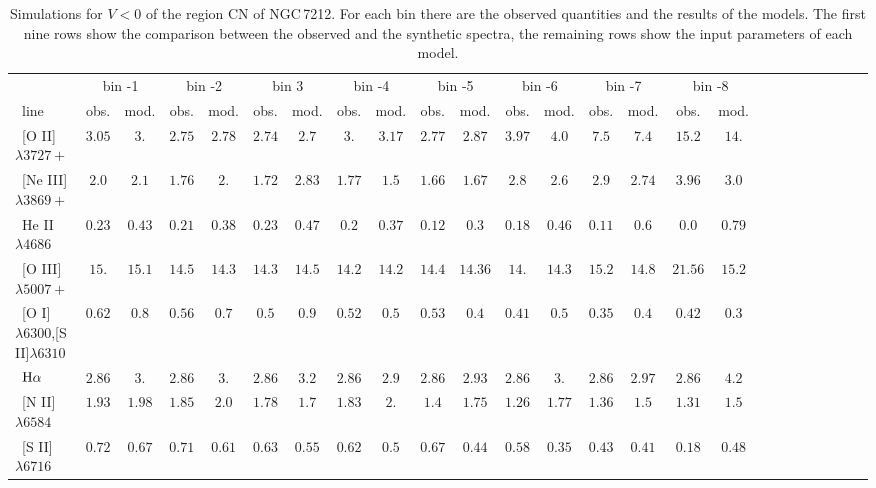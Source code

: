 \documentclass[../thesis.tex]{subfiles}
\begin{document}
\begin{landscape}
\begin{table}

\centering
\caption{Simulations for $V<0$ of the region CN of NGC\,7212. For each bin there are the observed quantities and the results of the models. The first nine rows show the comparison between the observed and the synthetic spectra, the remaining rows show the input parameters of each model.}
\label{tab:sim_cn-N}
\footnotesize{
\begin{tabular}{lcccccccccccccccccccccccc}
\hline
\ &\multicolumn{2}{c}{bin -1}&\multicolumn{2}{c}{bin -2}&\multicolumn{2}{c}{bin 3}&\multicolumn{2}{c}{bin -4}&\multicolumn{2}{c}{bin -5}&\multicolumn{2}{c}{bin -6}&\multicolumn{2}{c}{bin -7}&\multicolumn{2}{c}{bin -8}\\
\   line              &obs.  &mod. &obs.&mod.    &obs.  &mod. &obs.  &mod.   &obs.&mod.   & obs. &mod.   &  obs. &mod.&obs. &mod. \\ \hline
\ [O II]$\lambda3727+$          &$3.05   $&$ 3.   $&$2.75 $&$2.78  $&$2.74  $&$2.7   $&$3.    $&$3.17  $&$2.77  $&$2.87 $&$  3.97 $&$ 4.0  $&$ 7.5   $&$7.4 $&$15.2  $&$14.  $\\
\  [Ne III]$\lambda3869+$        &$2.0    $&$ 2.1  $&$1.76 $&$2.    $&$1.72  $&$2.83  $&$1.77  $&$1.5   $&$1.66  $&$1.67 $&$ 2.8  $&$ 2.6   $&$ 2.9   $&$2.74$&$3.96  $&$3.0  $ \\
\  He II $\lambda4686$           &$0.23   $&$ 0.43 $&$0.21 $&$0.38  $&$0.23  $&$0.47  $&$0.2   $&$0.37  $&$0.12  $&$0.3  $&$ 0.18 $&$ 0.46  $&$0.11   $&$0.6 $&$0.0   $&$0.79$\\
\  [O III]$\lambda5007+$         &$ 15.   $&$ 15.1 $&$14.5 $&$14.3  $&$14.3  $&$14.5  $&$14.2  $&$14.2  $&$14.4  $&$14.36$&$ 14.  $&$14.3   $&$15.2   $&$14.8$&$21.56 $&$15.2 $\\
\ [O I]$\lambda6300$,[S II]$\lambda6310$ &$0.62   $&$0.8   $&$0.56 $&$0.7   $&$0.5   $&$0.9   $&$0.52  $&$0.5   $&$0.53  $&$0.4  $&$ 0.41 $&$ 0.5   $&$0.35   $&$0.4 $&$0.42  $&$0.3 $\\
\ $\rm H\alpha$                 &$2.86   $&$ 3.   $&$2.86 $&$3.    $&$2.86  $&$3.2   $&$2.86  $&$2.9   $&$2.86  $&$2.93 $&$ 2.86 $&$ 3.    $&$2.86   $&$2.97$&$2.86  $&$4.2$ \\
\  [N II]$\lambda6584$           &$1.93   $&$ 1.98 $&$1.85 $&$2.0   $&$1.78  $&$1.7   $&$1.83  $&$2.    $&$1.4   $&$1.75 $&$ 1.26 $&$ 1.77  $&$1.36   $&$1.5 $&$1.31  $&$1.5$ \\
\  [S II]$\lambda6716$           &$0.72   $&$ 0.67 $&$0.71 $&$0.61  $&$0.63  $&$0.55  $&$0.62  $&$0.5   $&$0.67  $&$0.44 $&$ 0.58$&$ 0.35   $&$0.43   $&$0.41$&$0.18  $&$0.48$\\

\end{tabular}}
\end{table}
\end{landscape}
\end{document}
